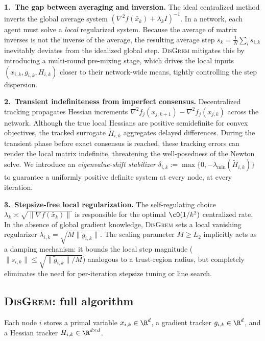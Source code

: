 \documentclass[review,onefignum,onetabnum]{siamart171218}
\begin{document}
	\noindent\textbf{1.\ The gap between averaging and inversion.}
	The ideal centralized method inverts the global average system
	$(\nabla^2 f(\bar x_k)+\lambda_k I)^{-1}$.
	In a network, each agent must solve a \emph{local} regularized
	system.
	Because the average of matrix inverses is not the inverse of the
	average, the resulting average step
	$\bar s_k=\frac1N\sum_i s_{i,k}$ inevitably deviates from the
	idealized global step.
	\textsc{DisGrem} mitigates this by introducing a multi-round
	pre-mixing stage, which drives the local inputs
	$(x_{i,k},g_{i,k},H_{i,k})$ closer to their network-wide means,
	tightly controlling the step dispersion.

	\noindent\textbf{2.\ Transient indefiniteness from imperfect consensus.}
	Decentralized tracking propagates Hessian increments
	$\nabla^2 f_j(x_{j,k+1})-\nabla^2 f_j(x_{j,k})$ across
	the network.
	Although the true local Hessians are positive semidefinite for
	convex objectives, the tracked surrogate $\tilde H_{i,k}$
	aggregates delayed differences.
	During the transient phase before exact consensus is reached,
	these tracking errors can render the local matrix indefinite,
	threatening the well-posedness of the Newton solve.
	We introduce an \emph{eigenvalue-shift stabilizer}
	$\delta_{i,k}:=\max\{0,-\lambda_{\min}(\tilde H_{i,k})\}$ to
	guarantee a uniformly positive definite system at every node,
	at every iteration.

	\noindent\textbf{3.\ Stepsize-free local regularization.}
	The self-regulating choice
	$\lambda_k\asymp\sqrt{\|\nabla f(\bar x_k)\|}$ is responsible
	for the optimal $\cO(1/k^2)$ centralized rate.
	In the absence of global gradient knowledge, \textsc{DisGrem}
	sets a local vanishing regularizer
	$\lambda_{i,k}=\sqrt{M\|\tilde g_{i,k}\|}$.
	The scaling parameter $M\ge L_2$ implicitly acts as a damping
	mechanism: it bounds the local step magnitude
	($\|s_{i,k}\|\le\sqrt{\|\tilde g_{i,k}\|/M}$) analogous to a
	trust-region radius, but completely eliminates the need for
	per-iteration stepsize tuning or line search.
	
	\subsection{\textsc{DisGrem}: full algorithm}\label{ssec:disgrem}
	
	Each node $i$ stores a primal variable $x_{i,k}\in\R^d$, a gradient tracker $g_{i,k}\in\R^d$,
	and a Hessian tracker $H_{i,k}\in\R^{d\times d}$.
	
\end{document}
